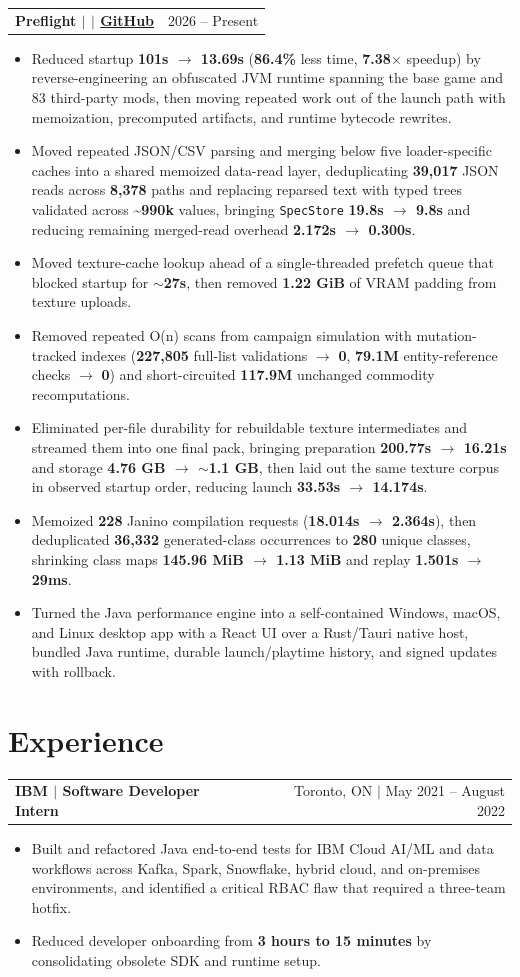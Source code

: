 \documentclass[letterpaper,11pt]{article}
\makeatletter
\newcommand{\resumeHeadingSimple}[2]{%
  \begin{tabularx}{\textwidth}{@{}Xr@{}}
    \textbf{#1} & #2
  \end{tabularx}\vspace{-0.25pt}
}
\newcommand{\resumeItemListStart}{\begin{itemize}[leftmargin=0.23in,itemsep=1.2pt,parsep=0pt,topsep=1.0pt]}
\newcommand{\resumeItem}[1]{\item\fontsize{10.6pt}{12.2pt}\selectfont #1}
\newcommand{\resumeItemListEnd}{\end{itemize}\vspace{-0.25pt}}
\makeatother
\begin{document}
\resumeHeadingSimple
  {Preflight $|$ \normalfont{Cross-platform performance launcher \& mod analysis toolkit} $|$ \href{https://github.com/teamleaderleo/preflight}{GitHub}}
  {2026 -- Present}
\resumeItemListStart
  \resumeItem{Reduced startup \textbf{101s $\rightarrow$ 13.69s} (\textbf{86.4\%} less time, \textbf{7.38$\times$} speedup) by reverse-engineering an obfuscated JVM runtime spanning the base game and 83 third-party mods, then moving repeated work out of the launch path with memoization, precomputed artifacts, and runtime bytecode rewrites.}
  \resumeItem{Moved repeated JSON/CSV parsing and merging below five loader-specific caches into a shared memoized data-read layer, deduplicating \textbf{39,017} JSON reads across \textbf{8,378} paths and replacing reparsed text with typed trees validated across \textbf{\textasciitilde990k} values, bringing \texttt{SpecStore} \textbf{19.8s $\rightarrow$ 9.8s} and reducing remaining merged-read overhead \textbf{2.172s $\rightarrow$ 0.300s}.}
  \resumeItem{Moved texture-cache lookup ahead of a single-threaded prefetch queue that blocked startup for \textbf{$\sim$27s}, then removed \textbf{1.22 GiB} of VRAM padding from texture uploads.}
  \resumeItem{Removed repeated O(n) scans from campaign simulation with mutation-tracked indexes (\textbf{227,805} full-list validations $\rightarrow$ \textbf{0}, \textbf{79.1M} entity-reference checks $\rightarrow$ \textbf{0}) and short-circuited \textbf{117.9M} unchanged commodity recomputations.}
  \resumeItem{Eliminated per-file durability for rebuildable texture intermediates and streamed them into one final pack, bringing preparation \textbf{200.77s $\rightarrow$ 16.21s} and storage \textbf{4.76 GB $\rightarrow$ $\sim$1.1 GB}, then laid out the same texture corpus in observed startup order, reducing launch \textbf{33.53s $\rightarrow$ 14.174s}.}
  \resumeItem{Memoized \textbf{228} Janino compilation requests (\textbf{18.014s $\rightarrow$ 2.364s}), then deduplicated \textbf{36,332} generated-class occurrences to \textbf{280} unique classes, shrinking class maps \textbf{145.96 MiB $\rightarrow$ 1.13 MiB} and replay \textbf{1.501s $\rightarrow$ 29ms}.}
  \resumeItem{Turned the Java performance engine into a self-contained Windows, macOS, and Linux desktop app with a React UI over a Rust/Tauri native host, bundled Java runtime, durable launch/playtime history, and signed updates with rollback.}
\resumeItemListEnd

\section{Experience}
\resumeHeadingSimple
  {IBM $|$ Software Developer Intern}
  {Toronto, ON $|$ May 2021 -- August 2022}
\resumeItemListStart
  \resumeItem{Built and refactored Java end-to-end tests for IBM Cloud AI/ML and data workflows across Kafka, Spark, Snowflake, hybrid cloud, and on-premises environments, and identified a critical RBAC flaw that required a three-team hotfix.}
  \resumeItem{Reduced developer onboarding from \textbf{3 hours to 15 minutes} by consolidating obsolete SDK and runtime setup.}
\resumeItemListEnd
\end{document}
